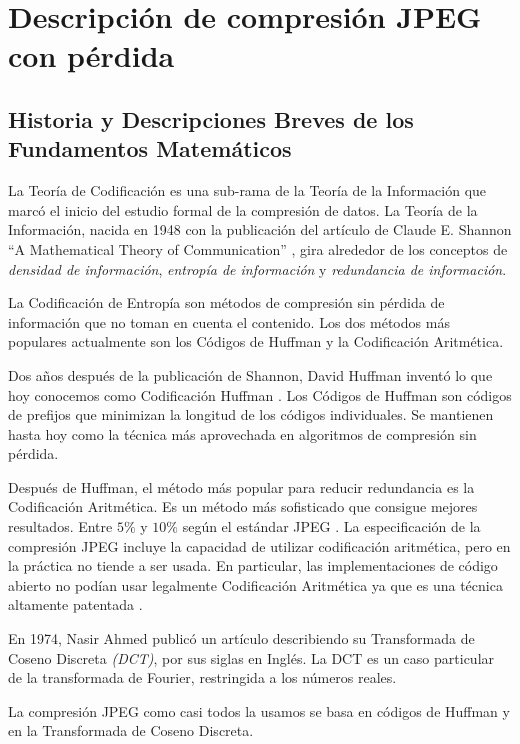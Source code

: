 \chapter{Descripción de compresión JPEG con pérdida}\label{ch:jpeg_desc}

\section{Historia y Descripciones Breves de los Fundamentos Matemáticos}

La Teoría de Codificación es una sub-rama de la Teoría de la Información que
marcó el inicio del estudio formal de la compresión de datos. La Teoría de la
Información, nacida en 1948 con la publicación del artículo de Claude E.
Shannon ``A Mathematical Theory of Communication'' \cite{shannon}, gira
alrededor de los conceptos de \emph{densidad de información}, \emph{entropía de
información} y \emph{redundancia de información}.

La Codificación de Entropía son métodos de compresión sin pérdida de
información que no toman en cuenta el contenido. Los dos métodos más populares
actualmente son los Códigos de Huffman y la Codificación Aritmética.

Dos años después de la publicación de Shannon, David Huffman inventó lo que hoy
conocemos como Codificación Huffman \cite{Huffman}. Los Códigos de Huffman son
códigos de prefijos que minimizan la longitud de los códigos individuales. Se
mantienen hasta hoy como la técnica más aprovechada en algoritmos de compresión
sin pérdida.

Después de Huffman, el método más popular para reducir redundancia es la
Codificación Aritmética. Es un método más sofisticado que consigue mejores
resultados. Entre $5\%$ y $10\%$ según el estándar JPEG \cite{JPEGSTD}. La
especificación de la compresión JPEG incluye la capacidad de utilizar
codificación aritmética, pero en la práctica no tiende a ser usada. En
particular, las implementaciones de código abierto no podían usar legalmente
Codificación Aritmética ya que es una técnica altamente patentada
\cite{jpeg_patents}.

En 1974, Nasir Ahmed publicó un artículo describiendo su Transformada de Coseno
Discreta \emph{(DCT)}, por sus siglas en Inglés. La DCT es un caso particular
de la transformada de Fourier, restringida a los números reales.

La compresión JPEG como casi todos la usamos se basa en códigos de Huffman y en
la Transformada de Coseno Discreta.

